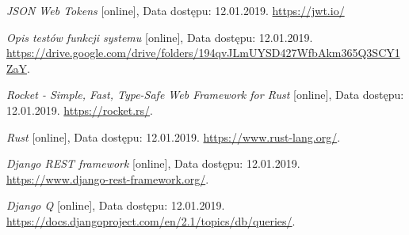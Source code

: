 \documentclass[12pt, notitlepage]{article}
\begin{document}
\newpage

\begin{thebibliography}{9}

\textit{JSON Web Tokens} [online], Data dostępu: 12.01.2019. 
\newline\url{https://jwt.io/}

\textit{Opis testów funkcji systemu} [online], Data dostępu: 12.01.2019. 
\newline\url{https://drive.google.com/drive/folders/194qvJLmUYSD427WfbAkm365Q3SCY1ZaY}.

\textit{Rocket - Simple, Fast, Type-Safe Web Framework for Rust} [online], Data dostępu: 12.01.2019. 
\newline\url{https://rocket.rs/}.

\textit{Rust} [online], Data dostępu: 12.01.2019. 
\newline\url{https://www.rust-lang.org/}.

\textit{Django REST framework} [online], Data dostępu: 12.01.2019. 
\newline\url{https://www.django-rest-framework.org/}.

\textit{Django Q} [online], Data dostępu: 12.01.2019. 
\newline\url{https://docs.djangoproject.com/en/2.1/topics/db/queries/}.

\end{thebibliography} 
\end{document}
